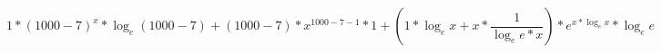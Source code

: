 \documentclass[a4paper]{article}
\begin{document}
$$
1*\left(1000-7\right)^{x}*\log_{e}\left(1000-7\right)+\left(1000-7\right)*x^{1000-7-1}*1+\left(1*\log_{e}x+x*\frac{1}{\log_{e}e*x}\right)*e^{x*\log_{e}x}*\log_{e}e
$$
\end{document}
